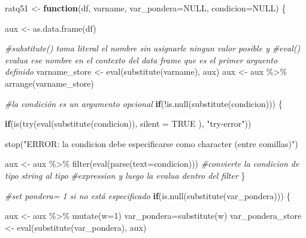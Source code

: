 \documentclass[
]{book}
\newenvironment{Shaded}{\begin{snugshade}}{\end{snugshade}}
\newcommand{\AttributeTok}[1]{\textcolor[rgb]{0.77,0.63,0.00}{#1}}
\newcommand{\CommentTok}[1]{\textcolor[rgb]{0.56,0.35,0.01}{\textit{#1}}}
\newcommand{\ConstantTok}[1]{\textcolor[rgb]{0.00,0.00,0.00}{#1}}
\newcommand{\ControlFlowTok}[1]{\textcolor[rgb]{0.13,0.29,0.53}{\textbf{#1}}}
\newcommand{\DecValTok}[1]{\textcolor[rgb]{0.00,0.00,0.81}{#1}}
\newcommand{\FunctionTok}[1]{\textcolor[rgb]{0.00,0.00,0.00}{#1}}
\newcommand{\NormalTok}[1]{#1}
\newcommand{\OtherTok}[1]{\textcolor[rgb]{0.56,0.35,0.01}{#1}}
\newcommand{\SpecialCharTok}[1]{\textcolor[rgb]{0.00,0.00,0.00}{#1}}
\newcommand{\StringTok}[1]{\textcolor[rgb]{0.31,0.60,0.02}{#1}}
\begin{document}
\begin{Shaded}
\begin{Highlighting}[numbers=left,,]
\NormalTok{ratq51 }\OtherTok{\textless{}{-}} \ControlFlowTok{function}\NormalTok{(df, varname, }\AttributeTok{var\_pondera=}\ConstantTok{NULL}\NormalTok{, }\AttributeTok{condicion=}\ConstantTok{NULL}\NormalTok{) \{}
    
\NormalTok{    aux }\OtherTok{\textless{}{-}} \FunctionTok{as.data.frame}\NormalTok{(df) }
    
    \CommentTok{\#substitute() toma literal el nombre sin asignarle ningun valor posible y }
    \CommentTok{\#eval() evalua ese nombre en el contexto del data frame que es el primer arguento definido}
\NormalTok{    varname\_store }\OtherTok{\textless{}{-}} \FunctionTok{eval}\NormalTok{(}\FunctionTok{substitute}\NormalTok{(varname), aux) }
\NormalTok{    aux }\OtherTok{\textless{}{-}}\NormalTok{ aux }\SpecialCharTok{\%\textgreater{}\%} \FunctionTok{arrange}\NormalTok{(varname\_store)}
    
    
    \CommentTok{\#la condición es un argumento opcional}
    \ControlFlowTok{if}\NormalTok{(}\SpecialCharTok{!}\FunctionTok{is.null}\NormalTok{(}\FunctionTok{substitute}\NormalTok{(condicion))) \{}
      
       \ControlFlowTok{if}\NormalTok{(}\FunctionTok{is}\NormalTok{(}\FunctionTok{try}\NormalTok{(}\FunctionTok{eval}\NormalTok{(}\FunctionTok{substitute}\NormalTok{(condicion)), }\AttributeTok{silent =} \ConstantTok{TRUE}\NormalTok{ ), }\StringTok{"try{-}error"}\NormalTok{))}
        
          \FunctionTok{stop}\NormalTok{(}\StringTok{"ERROR: la condicion debe especificarse como character (entre comillas)"}\NormalTok{)}
      
\NormalTok{          aux }\OtherTok{\textless{}{-}}\NormalTok{ aux }\SpecialCharTok{\%\textgreater{}\%} \FunctionTok{filter}\NormalTok{(}\FunctionTok{eval}\NormalTok{(}\FunctionTok{parse}\NormalTok{(}\AttributeTok{text=}\NormalTok{condicion)))  }\CommentTok{\#convierte la condicion de tipo string al tipo }
                                                            \CommentTok{\#expression y luego la evalua dentro del filter}
\NormalTok{    \}}
    
    
    \CommentTok{\#set pondera= 1 si no está especificado}
    \ControlFlowTok{if}\NormalTok{(}\FunctionTok{is.null}\NormalTok{(}\FunctionTok{substitute}\NormalTok{(var\_pondera))) \{                           }
      
\NormalTok{      aux }\OtherTok{\textless{}{-}}\NormalTok{ aux }\SpecialCharTok{\%\textgreater{}\%} \FunctionTok{mutate}\NormalTok{(}\AttributeTok{w=}\DecValTok{1}\NormalTok{)}
\NormalTok{      var\_pondera}\OtherTok{=}\FunctionTok{substitute}\NormalTok{(w)}
\NormalTok{      var\_pondera\_store }\OtherTok{\textless{}{-}} \FunctionTok{eval}\NormalTok{(}\FunctionTok{substitute}\NormalTok{(var\_pondera), aux)}
      

\end{Highlighting}
\end{Shaded}
\end{document}
